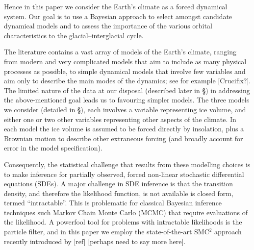 \documentclass[a4paper,12pt]{article}
\begin{document}
Hence in this paper we consider the Earth's climate as a forced dynamical system.  
Our goal is to use a Bayesian approach to select amongst candidate dynamical models and
to assess the importance of the various orbital characteristics to the
glacial--interglacial cycle.

The literature contains a vast array of models of the Earth's climate, ranging from
modern and very complicated models that aim to include as many physical processes as
possible, to simple dynamical models that involve few variables and aim only to describe
the main modes of the dynamics; see for example [Crucifix?].  
The limited nature of the data at our disposal (described later in \S) in addressing the
above-mentioned goal leads us 
to favouring simpler models.  The three models we consider (detailed in \S), each
involves a variable representing ice volume, and either one or two other variables
representing other aspects of the climate.  In each model the ice volume is assumed to
be forced directly by insolation, plus a Brownian motion to describe other extraneous
forcing (and broadly account for error in the model specification).  

Consequently, the
statistical challenge that results from these modelling choices is to make 
inference for partially observed, forced
non-linear stochastic differential equations (SDEs).  A major challenge in SDE inference 
is that the transition density, and therefore the likelihood function, is not
available is closed form, termed ``intractable''.  
This is problematic for classical Bayesian inference
techniques such Markov Chain Monte Carlo (MCMC) that require evaluations of the
likelihood.  A powerfool tool for problems with intractable likelihoods is the particle
filter, and in this paper we employ the state-of-the-art SMC$^2$ approach recently
introduced by [ref] [perhaps need to say more here].
\end{document}
